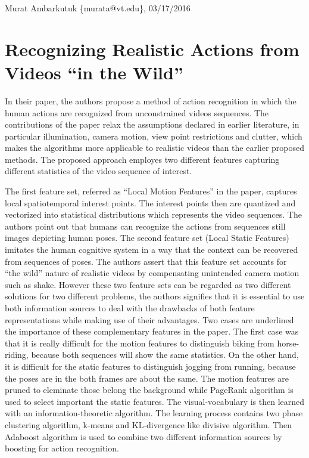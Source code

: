 \documentclass[11pt]{article}
\begin{document}
\thispagestyle{empty}
\begin{flushright}
	\small{Murat Ambarkutuk \{murata@vt.edu\}, 03/17/2016}
\end{flushright}
\section{Recognizing Realistic Actions from Videos ``in the Wild''}
In their paper, the authors propose a method of action recognition in which the human actions are recognized from unconstrained videos sequences.
The contributions of the paper relax the assumptions declared in earlier literature, in particular illumination, camera motion, view point restrictions and clutter, which makes the algorithms more applicable to realistic videos than the earlier proposed methods.
The proposed approach employes two different features capturing different statistics of the video sequence of interest.

The first feature set, referred as ``Local Motion Features'' in the paper, captures local spatiotemporal interest points.
The interest points then are quantized and vectorized into statistical distributions which represents the video sequences.
The authors point out that humans can recognize the actions from sequences still images depicting human poses.
The second feature set (Local Static Features) imitates the human cognitive system in a way that the context can be recovered from sequences of poses.
The authors assert that this feature set accounts for ``the wild'' nature of realistic videos by compensating unintended camera motion such as shake.
However these two feature sets can be regarded as two different solutions for two different problems, the authors signifies that it is essential to use both information sources to deal with the drawbacks of both feature representations while making use of their advantages.
Two cases are underlined the importance of these complementary features in the paper.
The first case was that it is really difficult for the motion features to distinguish biking from horse-riding, because both sequences will show the same statistics.
On the other hand, it is difficult for the static features to distinguish jogging from running, because the poses are in the both frames are about the same.
The motion features are pruned to eleminate those belong the background while PageRank algorithm is used to select important the static features.
The visual-vocabulary is then learned with an information-theoretic algorithm.
The learning process contains two phase clustering algorithm, k-means and KL-divergence like divisive algorithm.
Then Adaboost algorithm is used to combine two different information sources by boosting for action recognition.
\end{document}
